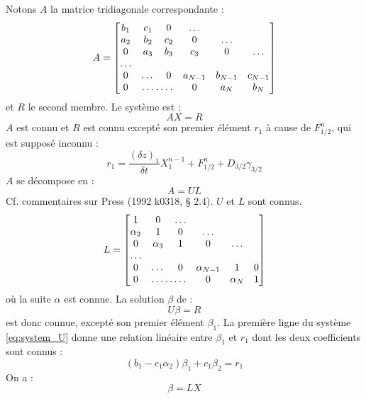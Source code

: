 \documentclass[a4paper,english,french]{article}
\begin{document}
Notons $A$ la matrice tridiagonale correspondante :
\begin{equation*}
  A =
  \begin{bmatrix}
    b_1 & c_1  & 0 & \dots \\
    a_2 & b_2  & c_2 &  0 & \dots \\
    0 & a_3 & b_3 & c_3 & 0 & \dots \\
    \dots \\
    0 & \dots & 0 & a_{N - 1} & b_{N - 1} & c_{N - 1} \\
    0 & \hdotsfor{2} & 0 & a_N & b_N
  \end{bmatrix}
\end{equation*}
et $R$ le second membre. Le système est :
\begin{equation*}
  A X = R
\end{equation*}
$A$ est connu et $R$ est connu excepté son premier élément $r_1$ à
cause de $F_{1/2}^n$, qui est supposé inconnu :
\begin{equation*}
  r_1
  = \frac{(\delta z)_1}{\delta t} X_1^{n - 1} + F_{1/2}^n + D_{3/2} \gamma_{3/2}
\end{equation*}
$A$ se décompose en :
\begin{equation*}
  A = U L
\end{equation*}
Cf. commentaires sur Press (1992 k0318, § 2.4). $U$ et $L$ sont
connus.
\begin{equation*}
  L = 
  \begin{bmatrix}
    1 & 0 & \dots \\
    \alpha_2 & 1 & 0 & \dots \\
    0 & \alpha_3 & 1 & 0 & \dots \\
    \dots \\
    0 & \dots & 0 & \alpha_{N - 1} & 1 & 0 \\
    0 & \hdotsfor{2} & 0 & \alpha_N & 1
  \end{bmatrix}
\end{equation*}
où la suite $\alpha$ est connue. La solution $\beta$ de :
\begin{equation}
  \label{eq:system_U}
  U \beta = R
\end{equation}
est donc connue, excepté son premier élément $\beta_1$. La première
ligne du système \ref{eq:system_U} donne une relation linéaire entre
$\beta_1$ et $r_1$ dont les deux coefficients sont connus :
\begin{equation*}
  (b_1 - c_1 \alpha_2) \beta_1 + c_1 \beta_2 = r_1
\end{equation*}
On a :
\begin{equation}
  \label{eq:system_L}
  \beta = L X
\end{equation}
\end{document}
